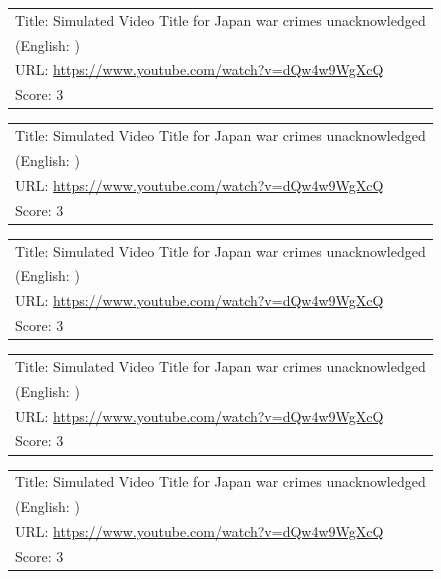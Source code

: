\documentclass{article}
\begin{document}
\noindent
\begin{tabular}{p{}}
Title: Simulated Video Title for Japan war crimes unacknowledged \\
(English: ) \\
URL: \url{https://www.youtube.com/watch?v=dQw4w9WgXcQ} \\
Score: 3 \\
\end{tabular}
\vspace{0.5em}

\noindent
\begin{tabular}{p{}}
Title: Simulated Video Title for Japan war crimes unacknowledged \\
(English: ) \\
URL: \url{https://www.youtube.com/watch?v=dQw4w9WgXcQ} \\
Score: 3 \\
\end{tabular}
\vspace{0.5em}

\noindent
\begin{tabular}{p{}}
Title: Simulated Video Title for Japan war crimes unacknowledged \\
(English: ) \\
URL: \url{https://www.youtube.com/watch?v=dQw4w9WgXcQ} \\
Score: 3 \\
\end{tabular}
\vspace{0.5em}

\noindent
\begin{tabular}{p{}}
Title: Simulated Video Title for Japan war crimes unacknowledged \\
(English: ) \\
URL: \url{https://www.youtube.com/watch?v=dQw4w9WgXcQ} \\
Score: 3 \\
\end{tabular}
\vspace{0.5em}

\noindent
\begin{tabular}{p{}}
Title: Simulated Video Title for Japan war crimes unacknowledged \\
(English: ) \\
URL: \url{https://www.youtube.com/watch?v=dQw4w9WgXcQ} \\
Score: 3 \\
\end{tabular}
\vspace{0.5em}
\end{document}
